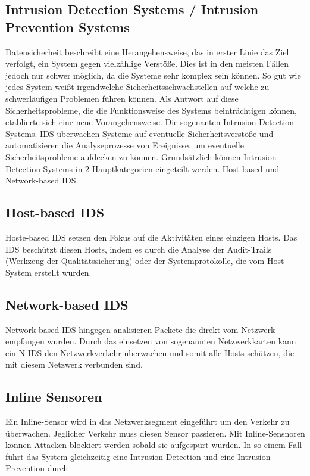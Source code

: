 \subsection{Intrusion Detection Systems / Intrusion Prevention Systems}
Datensicherheit beschreibt eine Herangehensweise, das in erster Linie das Ziel verfolgt, ein System gegen vielzählige Verstöße. Dies ist in den meisten Fällen jedoch nur schwer möglich, da die Systeme sehr komplex sein können. So gut wie jedes System weißt irgendwelche Sicherheitsschwachstellen auf welche zu schwerläufigen Problemen führen können.
Als Antwort auf diese Sicherheitsprobleme, die die Funktionsweise des Systems beinträchtigen können, etablierte sich eine neue Vorangehensweise. Die sogenanten Intrusion Detection Systems.
IDS überwachen Systeme auf eventuelle Sicherheitsverstöße und automatisieren die Analyseprozesse von Ereignisse, um eventuelle Sicherheitsprobleme aufdecken zu können.\cite{haystack_ids}
Grundsätzlich können Intrusion Detection Systems in 2 Hauptkategorien eingeteilt werden. Host-based und Network-based IDS.\cite{IDS_1}

\subsection{Host-based IDS}
Hoste-based IDS setzen den Fokus auf die Aktivitäten eines einzigen Hosts. Das IDS beschützt diesen Hosts, indem es durch die Analyse der Audit-Trails (Werkzeug der Qualitätssicherung) oder der Systemprotokolle, die vom Host-System erstellt wurden. \cite{IDS_1}

\subsection{Network-based IDS}
Network-based IDS hingegen analisieren Packete die direkt vom Netzwerk empfangen wurden. Durch das einsetzen von sogenannten Netzwerkkarten kann ein N-IDS den Netzwerkverkehr überwachen und somit alle Hosts schützen, die mit diesem Netzwerk verbunden sind.\cite{IDS_1}

\subsection{Inline Sensoren}
Ein Inline-Sensor wird in das Netzwerksegment eingeführt um den Verkehr zu überwachen. Jeglicher Verkehr muss diesen Sensor passieren. Mit Inline-Sensnoren können Attacken blockiert werden sobald sie aufgespürt wurden. In so einem Fall führt das System gleichzeitig eine Intrusion Detection und eine Intrusion Prevention durch\cite{url_sensors}

